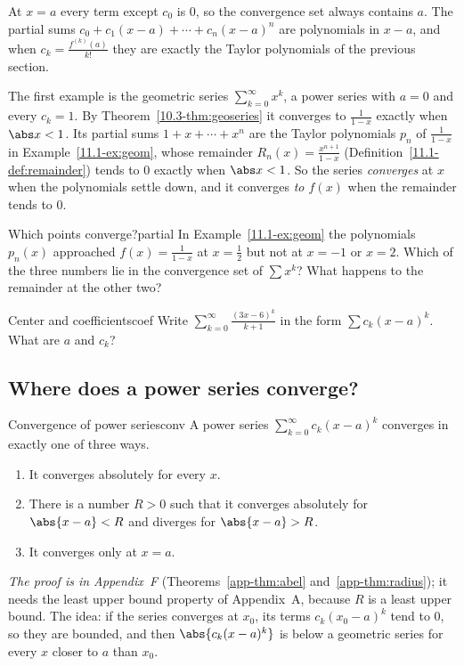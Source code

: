 \documentclass[11pt]{article}
\begin{document}
At $x=a$ every term except $c_0$ is $0$, so the convergence set always contains $a$. The partial sums $c_0+c_1(x-a)+\cdots+c_n(x-a)^n$ are polynomials in $x-a$, and when $c_k=\frac{f^{(k)}(a)}{k!}$ they are exactly the Taylor polynomials of the previous section.

The first example is the geometric series $\sum_{k=0}^\infty x^k$, a power series with $a=0$ and every $c_k=1$. By Theorem~\ref{10.3-thm:geoseries} it converges to $\frac1{1-x}$ exactly when $\abs x<1$. Its partial sums $1+x+\cdots+x^n$ are the Taylor polynomials $p_n$ of $\frac1{1-x}$ in Example~\ref{11.1-ex:geom}, whose remainder $R_n(x)=\frac{x^{n+1}}{1-x}$ (Definition~\ref{11.1-def:remainder}) tends to $0$ exactly when $\abs x<1$. So the series \emph{converges} at $x$ when the polynomials settle down, and it converges \emph{to $f(x)$} when the remainder tends to $0$.

\begin{think}{Which points converge?}{partial}
In Example~\ref{11.1-ex:geom} the polynomials $p_n(x)$ approached $f(x)=\frac1{1-x}$ at $x=\frac12$ but not at $x=-1$ or $x=2$. Which of the three numbers lie in the convergence set of $\sum x^k$? What happens to the remainder at the other two?
\end{think}

\begin{kc}{Center and coefficients}{coef}
Write $\sum_{k=0}^\infty\frac{(3x-6)^k}{k+1}$ in the form $\sum c_k(x-a)^k$. What are $a$ and $c_k$?
\end{kc}

\subsection*{Where does a power series converge?}

\begin{thm}{Convergence of power series}{conv}
A power series $\sum_{k=0}^\infty c_k(x-a)^k$ converges in exactly one of three ways.
\begin{enumerate}
  \item It converges absolutely for every $x$.
  \item There is a number $R>0$ such that it converges absolutely for $\abs{x-a}<R$ and diverges for $\abs{x-a}>R$.
  \item It converges only at $x=a$.
\end{enumerate}
\end{thm}
\emph{The proof is in Appendix~F} (Theorems~\ref{app-thm:abel} and~\ref{app-thm:radius}); it needs the least upper bound property of Appendix~A, because $R$ is a least upper bound. The idea: if the series converges at $x_0$, its terms $c_k(x_0-a)^k$ tend to $0$, so they are bounded, and then $\abs{c_k(x-a)^k}$ is below a geometric series for every $x$ closer to $a$ than $x_0$.
\end{document}
